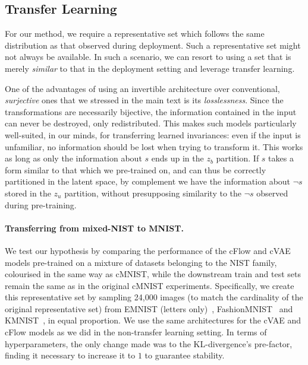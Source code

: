 \subsection{Transfer Learning}\label{sec:transfer-learning}
For our method, we require a representative set which follows the same distribution as that observed during deployment.
Such a representative set might not always be available.
In such a scenario, we can resort to using a set that is merely \emph{similar} to that in the deployment setting and leverage transfer learning.

One of the advantages of using an invertible architecture over conventional, \emph{surjective} ones that we stressed in the main text is its \emph{losslessness}. Since the transformations are necessarily bijective, the information contained in the input can never be destroyed, only redistributed. This makes such models particularly well-suited, in our minds, for transferring learned invariances:
even if the input is unfamiliar, no information should be lost when trying to transform it.
This works as long as only the information about $s$ ends up in the $z_b$ partition.
If $s$ takes a form similar to that which we pre-trained on, and can thus be correctly partitioned in the latent space, by complement we have the information about $\neg s$ stored in the $z_u$ partition, without presupposing similarity to the $\neg s$ observed during pre-training.

\paragraph{Transferring from mixed-NIST to MNIST.}
We test our hypothesis by comparing the performance of the cFlow and cVAE models pre-trained on a mixture of datasets belonging to the NIST family, colourised in the same way as cMNIST, while the downstream train and test sets remain the same as in the original cMNIST experiments. Specifically, we create this representative set by sampling 24,000 images (to match the cardinality of the original representative set) from EMNIST (letters only)~\citep{cohen2017emnist}, Fashion\-MNIST~\citep{xiao2017fashion} and KMNIST~\citep{clanuwat2018deep}, in equal proportion. We use the same architectures for the cVAE and cFlow models as we did in the non-transfer learning setting. In terms of hyperparameters, the only change made was to the KL-divergence's pre-factor, finding it necessary to increase it to $1$ to guarantee stability.

